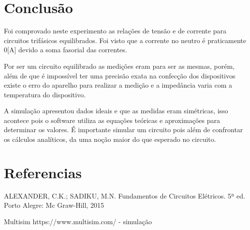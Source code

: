 \documentclass[a4paper, 12pt]{article}
\begin{document}
\newpage
\section{Conclusão}
\justifying
    Foi comprovado neste experimento as relações de tensão e de corrente para circuitos trifásicos equilibrados. Foi visto que a corrente no neutro é praticamente 0[A] devido a soma fasorial das correntes.
    
    Por ser um circuito equilibrado as medições eram para ser as mesmas, porém, além de que é impossível ter uma precisão exata na confecção dos dispositivos existe o erro do aparelho para realizar a medição e a impedância varia com a temperatura do dispositivo.
    
    A simulação apresentou dados ideais e que as medidas eram simétricas, isso acontece pois o software utiliza as equações teóricas e aproximações para determinar os valores. É importante  simular um circuito pois além de confrontar os cálculos analíticos, da uma noção maior do que esperado no circuito.
    
    
\newpage
\section*{Referencias}
\justifying

ALEXANDER, C.K.; SADIKU, M.N. Fundamentos de Circuitos Elétricos. 5ª ed.
Porto Alegre: Mc Graw-Hill, 2015


Multisim https://www.multisim.com/ - simulação
\end{document}
